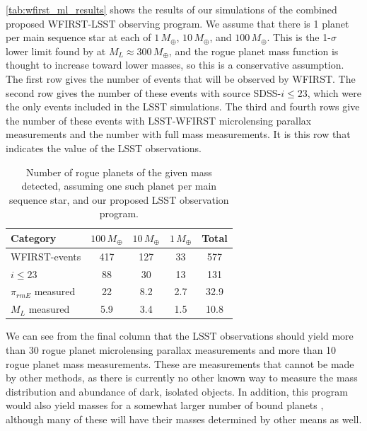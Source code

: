 \autoref{tab:wfirst_ml_results}
shows the results of our simulations of the combined proposed WFIRST-LSST
observing program. We assume that there is 1 planet per main sequence
star at each of $1\,M_\oplus$, $10\,M_\oplus$, and $100\,M_\oplus$.
This is the 1-$\sigma$ lower limit found by \citet{2011Natur.473..349S} at
$M_L \approx 300\,M_\oplus$, and the rogue planet mass function is
thought to increase toward lower masses, so this is a conservative
assumption. The first row gives the number of events that will be
observed by WFIRST. The second row gives the number of these events
with source SDSS-$i \leq 23$, which were the only events included in the
LSST simulations. The third and fourth rows give the number of these events
with LSST-WFIRST microlensing parallax measurements and the number
with full mass measurements. It is this row that indicates the
value of the LSST observations.

\begin{table}
\begin{tabular}{lcccc}
Category & $100\,M_\oplus$ & $10\,M_\oplus$ & $1\,M_\oplus$ & Total \\
\hline
WFIRST-events    &   417   &         127    &         33    &  577  \\
$i \leq 23$      &    88   &          30    &         13    &  131  \\
$\pi_{rm E}$ measured &    22   &           8.2  &          2.7  &   32.9 \\
$M_L$ measured   &    5.9  &           3.4  &          1.5  &   10.8 \\
\end{tabular}
\caption{Number of rogue planets of the given mass detected, assuming
one such planet per main sequence star, and our proposed LSST observation
program.}
\label{tab:wfirst_ml_results}
\end{table}

We can see from the final column that the LSST observations should
yield more than 30 rogue planet microlensing parallax measurements and
more than 10 rogue planet mass measurements.
%
These are measurements that cannot be made by other methods, as there is 
currently no other known way to measure the mass distribution and abundance 
of dark, isolated objects.
%
In addition, this program would
also yield masses for a somewhat larger number of bound planets
\citep{2003ApJ...591L..53G}, although many of these will have their
masses determined by other means as well.

